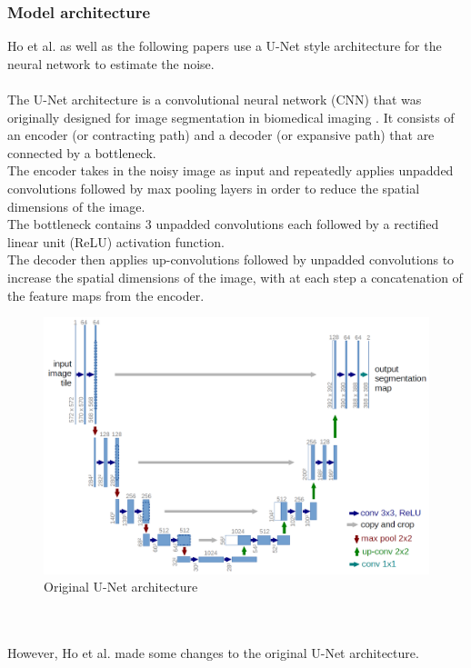\documentclass{article}
\begin{document}
\subsubsection{Model architecture}
Ho et al. \cite{ho2020denoising} as well as the following papers use a U-Net style architecture for the neural network to estimate the noise. 
\\\\
The U-Net architecture is a convolutional neural network (CNN) that was originally designed for image segmentation in biomedical imaging \cite{ronneberger2015unet}. It consists of an encoder (or contracting path) and a decoder (or expansive path) that are connected by a bottleneck. \\
The encoder takes in the noisy image as input and repeatedly applies unpadded convolutions followed by max pooling layers in order to reduce the spatial dimensions of the image. \cite{ronneberger2015unet} \\
The bottleneck contains 3 unpadded convolutions each followed by a rectified linear unit (ReLU) activation function. \cite{ronneberger2015unet} \\
The decoder then applies up-convolutions followed by unpadded convolutions to increase the spatial dimensions of the image, with at each step a concatenation of the feature maps from the encoder. \cite{ronneberger2015unet}
\begin{figure}[h]
  \includegraphics[width=\textwidth]{images/unet.png}
  \caption{Original U-Net architecture \cite{ronneberger2015unet}}
\end{figure}
\\\\
However, Ho et al. \cite{ho2020denoising} made some changes to the original U-Net architecture. \\
\end{document}
